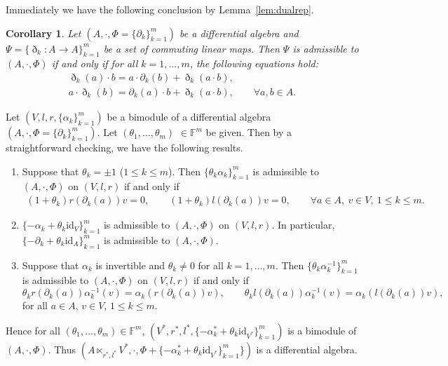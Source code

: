 \documentclass[pdftex]{sigma}
\numberwithin{equation}{section}
\newtheorem{Corollary}[Theorem]{Corollary}
\newcommand{\id}{\mathrm{id}}
\begin{document}
Immediately we have the following conclusion by Lemma~\ref{lem:dualrep}.

\begin{Corollary}\label{cor:qadm}
 Let $(A, \cdot, \Phi = \{\partial_k\}_{k=1}^m)$ be a differential algebra
 and $\Psi = \{\eth_k\colon A \to A \}_{k=1}^m$ be a set of commuting linear maps.
 Then
 $\Psi$ is admissible to $(A, \cdot, \Phi)$ if and only if for all $k=1, \dots, m$,
 the following equations hold:
 \begin{gather}
 \eth_k(a) \cdot b = a \cdot \partial_k(b) + \eth_k(a \cdot b), \label{eq:qadm1} \\
 a \cdot \eth_k(b) = \partial_k(a) \cdot b + \eth_k(a \cdot b), \qquad
 \forall a,b \in A. \label{eq:qadm2}
 \end{gather}
\end{Corollary}

\begin{Example}\label{ex:admissible}
 Let $(V, l, r, \{\alpha_k\}_{k=1}^m)$ be a bimodule of a differential algebra $(A, \cdot, \Phi = \{\partial_k\}_{k=1}^m)$.
 Let $(\theta_1, \dots, \theta_m)$ $\in \mathbb{F}^m$ be given.
 Then by a straightforward checking, we have the following results.
 \begin{enumerate}\itemsep=0pt
 \item Suppose that $\theta_k = \pm 1$ ($1 \leq k \leq m$).
 Then $\{\theta_k \alpha_k\}_{k=1}^m$ is admissible to $(A, \cdot, \Phi)$ on $(V, l, r)$ if and only if
 \begin{gather*}
 (1 + \theta_k)r(\partial_k(a)) v = 0, \qquad
 (1 + \theta_k)l(\partial_k(a)) v = 0, \qquad
 \forall a \in A, \ v \in V, \ 1 \leq k \leq m.
 \end{gather*}
 \item $\{-\alpha_k + \theta_k \id_V\}_{k=1}^m$ is admissible to $(A, \cdot, \Phi)$ on $(V, l, r)$.
 In particular, $\{-\partial_k + \theta_k \id_A \}_{k=1}^m$ is admissible to $(A, \cdot, \Phi)$.
 \item Suppose that $\alpha_k$ is invertible and $\theta_k \neq 0$ for all $k=1, \dots, m$.
 Then $\big\{\theta_k \alpha_k^{-1}\big\}_{k=1}^m$ is admissible to $(A, \cdot, \Phi)$ on $(V, l, r)$ if and only if
 \begin{equation*}
 \theta_k r(\partial_k(a)) \alpha_k^{-1}(v) = \alpha_k(r(\partial_k(a))v), \qquad
 \theta_k l(\partial_k(a)) \alpha_k^{-1}(v) = \alpha_k(l(\partial_k(a))v),
 \end{equation*}
 	for all $a \in A$, $v \in V$, $1 \leq k \leq m$.
 \end{enumerate}
 Hence for all $(\theta_1, \dots, \theta_m) \in \mathbb{F}^m$,
 $(V^*, r^*, l^*, \{-\alpha_k^* + \theta_k \id_{V^*} \}_{k=1}^m)$ is a bimodule of $(A, \cdot, \Phi)$.
 Thus $(A \ltimes_{r^*, l^*} V^*, \cdot, \Phi + \{-\alpha_k^* + \theta_k \id_{V^*}\}_{k=1}^m \})$ is a differential algebra.
\end{Example}
\end{document}
